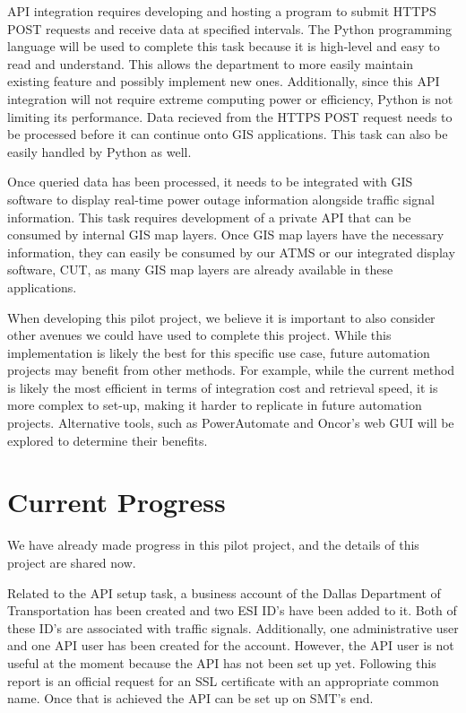 \documentclass[]{amsldoc}
\begin{document}
API integration requires developing and hosting a program to submit HTTPS POST requests and receive data at specified intervals. The Python programming language will be used to complete this task because it is high-level and easy to read and understand. This allows the department to more easily maintain existing feature and possibly implement new ones. Additionally, since this API integration will not require extreme computing power or efficiency, Python is not limiting its performance. Data recieved from the HTTPS POST request needs to be processed before it can continue onto GIS applications. This task can also be easily handled by Python as well.

Once queried data has been processed, it needs to be integrated with GIS software to display real-time power outage information alongside traffic signal information. This task requires development of a private API that can be consumed by internal GIS map layers. Once GIS map layers have the necessary information, they can easily be consumed by our ATMS or our integrated display software, CUT, as many GIS map layers are already available in these applications.

When developing this pilot project, we believe it is important to also consider other avenues we could have used to complete this project. While this implementation is likely the best for this specific use case, future automation projects may benefit from other methods. For example, while the current method is likely the most efficient in terms of integration cost and retrieval speed, it is more complex to set-up, making it harder to replicate in future automation projects. Alternative tools, such as PowerAutomate and Oncor's web GUI will be explored to determine their benefits.


\section{Current Progress}
We have already made progress in this pilot project, and the details of this project are shared now.

Related to the API setup task, a business account of the Dallas Department of Transportation has been created and two ESI ID's have been added to it. Both of these ID's are associated with traffic signals. Additionally, one administrative user and one API user has been created for the account. However, the API user is not useful at the moment because the API has not been set up yet. Following this report is an official request for an SSL certificate with an appropriate common name. Once that is achieved the API can be set up on SMT's end. 
\end{document}
